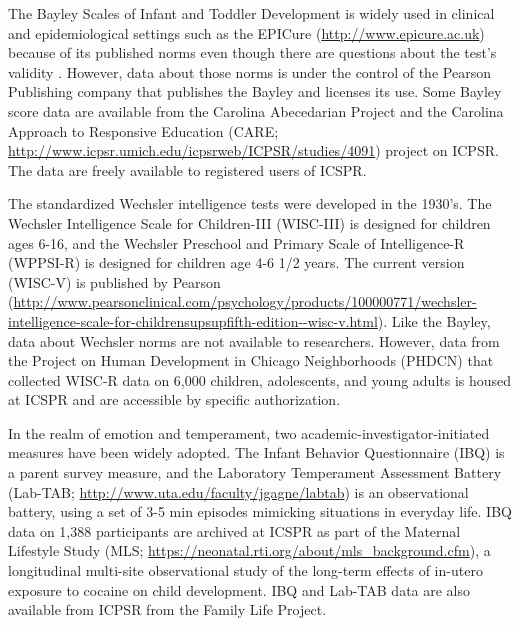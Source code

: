 \documentclass[letterpaper,man,apacite,natbib]{apa6}
\begin{document}
The Bayley Scales of Infant and Toddler Development \cite{bayley2006bayley} is widely used in clinical and epidemiological settings such as the EPICure (\url{http://www.epicure.ac.uk}) because of its published norms even though there are questions about the test's validity \cite{hack_poor_2005}.
However, data about those norms is under the control of the Pearson Publishing company that publishes the Bayley and licenses its use.
Some Bayley score data are available from the Carolina Abecedarian Project and the Carolina Approach to Responsive Education (CARE; \url{http://www.icpsr.umich.edu/icpsrweb/ICPSR/studies/4091}) project on ICPSR.
The data are freely available to registered users of ICSPR. 

The standardized Wechsler intelligence tests were developed in the 1930's. 
The Wechsler Intelligence Scale for Children-III (WISC-III) is designed for children ages 6-16, and the Wechsler Preschool and Primary Scale of Intelligence-R (WPPSI-R) is designed for children age 4-6 1/2 years.
The current version (WISC-V) is published by Pearson (\url{http://www.pearsonclinical.com/psychology/products/100000771/wechsler-intelligence-scale-for-childrensupsupfifth-edition--wisc-v.html}).
Like the Bayley, data about Wechsler norms are not available to researchers.
However, data from the Project on Human Development in Chicago Neighborhoods (PHDCN) that collected WISC-R data on 6,000 children, adolescents, and young adults is housed at ICSPR and are accessible by specific authorization.

In the realm of emotion and temperament, two academic-investigator-initiated measures have been widely adopted.
The Infant Behavior Questionnaire (IBQ) is a parent survey measure, and the Laboratory Temperament Assessment Battery (Lab-TAB; \url{http://www.uta.edu/faculty/jgagne/labtab}) is an observational battery, using a set of 3-5 min episodes mimicking situations in everyday life.
IBQ data on 1,388 participants are archived at ICSPR as part of the Maternal Lifestyle Study (MLS; \url{https://neonatal.rti.org/about/mls_background.cfm}), a longitudinal multi-site observational study of the long-term effects of in-utero exposure to cocaine on child development.
IBQ and Lab-TAB data are also available from ICPSR from the Family Life Project.
\end{document}
